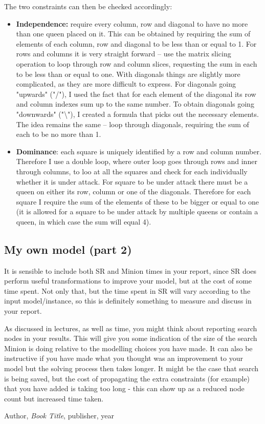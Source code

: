 \documentclass{report}
\begin{document}
The two constraints can then be checked accordingly:
\begin{itemize}
\item \textbf{Independence:} require every column, row and diagonal to have no more than one queen placed on it. This can be obtained by requiring the sum of elements of each column, row and diagonal to be less than or equal to 1. For rows and columns it is very straight forward -- use the matrix slicing operation to loop through row and column slices, requesting the sum in each to be less than or equal to one. With diagonals things are slightly more complicated, as they are more difficult to express. For diagonals going "upwards" ("/"), I used the fact that for each element of the diagonal its row and column indexes sum up to the same number. To obtain  diagonals going "downwards" ("\textbackslash "), I created a formula that picks out the necessary elements. The idea remains the same -- loop through diagonals, requiring the sum of each to be no more than 1.
\item \textbf{Dominance}: each square is uniquely identified by a row and column number. Therefore I use a double loop, where outer loop goes through rows and inner through columns, to loo at all the squares and check for each individually whether it is under attack. For square to be under attack there must be a queen on either its row, column or one of the diagonals. Therefore for each square I require the sum of the elements of these to be bigger or equal to one (it is allowed for a square to be under attack by multiple queens or contain a queen, in which case the sum will equal 4).
\end{itemize}

\subsection*{My own	model (part 2)}


It is sensible to include both SR and Minion times in your report, since SR does perform useful transformations to improve your model, but at the cost of some time spent. Not only that, but the time spent in SR will vary according to the input model/instance, so this is definitely something to measure and discuss in your report.

As discussed in lectures, as well as time, you might think about reporting search nodes in your results. This will give you some indication of the size of the search Minion is doing relative to the modelling choices you have made. It can also be instructive if you have made what you thought was an improvement to your model but the solving process then takes longer. It might be the case that search is being saved, but the cost of propagating the extra constraints (for example) that you have added is taking too long - this can show up as a reduced node count but increased time taken.





\begin{thebibliography}{9}

  Author,
  \emph{Book Title},
  publisher,
  year

\end{thebibliography}
\end{document}
